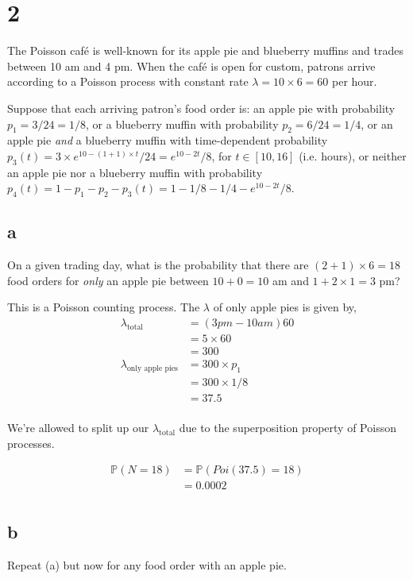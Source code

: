 \documentclass{article}
\newcommand{\prob}{\mathbb{P}}
\begin{document}
\section{2}
The Poisson caf\'e is well-known for its apple pie and blueberry muffins and
trades
between 10 am and 4 pm. When the caf\'e is open for custom, patrons arrive
according to a Poisson process with constant rate $\lambda = 10 \times 6 = 60$
per hour.

Suppose that each arriving patron's food order is: an apple pie with probability
$p_1 = 3/24 = 1/8$, or a blueberry muffin with probability $p_2 = 6/24 = 1/4$,
or an apple pie \textit{and} a blueberry muffin with time-dependent probability
$p_3(t) = 3 \times e^{10 - (1 + 1) \times t}/24
= e^{10 - 2t}/8$, for $t \in [10,16]$ (i.e. hours), or neither an apple pie nor
a blueberry muffin with probability $p_4(t) = 1 - p_1 - p_2 - p_3(t)
= 1 - 1/8 - 1/4 - e^{10 - 2t}/8$.

\subsection{a}
On a given trading day, what is the probability that there are
$(2+1) \times 6 = 18$ food orders for \textit{only} an apple pie between 
$10 + 0 = 10$ am and $1 + 2 \times 1 = 3$ pm?

This is a Poisson counting process. 
The $\lambda$ of only apple pies is given by,
\begin{align*}
    \lambda_{\text{total}} &= (3pm - 10am) 60 \\
    &= 5 \times 60 \\
    &= 300 \\
    \lambda_{\text{only apple pies}} &= 300 \times p_1 \\
    &= 300 \times 1/8 \\
    &= 37.5 \\
\end{align*}

We're allowed to split up our $\lambda_{\text{total}}$ due to the superposition
property of Poisson processes.

\begin{align*}
    \prob(N = 18) &= \prob(Poi(37.5) = 18) \\
    &= 0.0002 \\
\end{align*}

\subsection{b}
Repeat (a) but now for any food order with an apple pie.
\end{document}
